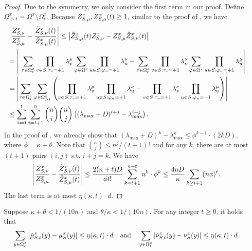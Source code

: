 \begin{proof}
Due to the symmetry, we only consider the first term in our proof.
Define $\Omega^x_{> t}=\Omega^x \setminus\Omega^x_{t}$.
Because $Z_{S,\mu}^x,\tilde{Z}_{S,\mu}^x (t)\geq 1$, similar to the proof of , we have
\begin{align*}
    &\left\vert \frac{Z_{S,\nu}^x}{Z_{S,\mu}^x} - \frac{\tilde{Z}_{S,\nu}^x (t)}{\tilde{Z}_{S,\mu}^x (t)} \right\vert \leq 
    \left\vert \tilde{Z}_{S,\mu}^x (t) Z_{S,\nu}^x - Z_{S,\mu}^x \tilde{Z}_{S,\nu}^x (t) \right\vert\\
    &=\left\vert \ \sum_{\tau \in \Omega^x_{t}} \prod_{v \in S: \tau_v = +1}\lambda^\mu_v \sum_{\varphi \in \Omega^x} \prod_{u \in S: \varphi_u = +1}\lambda^\nu_u - \sum_{\tau \in \Omega^x_{ t}} \prod_{v \in S: \tau_v = +1}\lambda^\nu_v \sum_{\varphi \in \Omega^x} \prod_{u \in S: \varphi_u = +1}\lambda^\mu_u\right\vert\\
    &=\left\vert \sum_{\tau \in \Omega^x_{ t}}\sum_{\varphi \in \Omega^x_{> t}}\left(\prod_{v \in S: \tau_v = +1}\lambda^\mu_v \prod_{u \in S: \varphi_u = +1}\lambda^\nu_u-\prod_{v \in S: \tau_v = +1}\lambda^\nu_v\prod_{u \in S: \varphi_u = +1}\lambda^\mu_u \right ) \right\vert\\
    &\leq  \sum_{i=0}^{t}\sum_{j=t+1}^{n}\binom{n}{i}\binom{n}{j}\left((\lambda_{\max}+D)^{i+j}-\lambda_{\max}^{i+j} \right).
\end{align*}
In the proof of , we already show that  $(\lambda_{\max}+D)^k - \lambda_{\max}^k \leq \phi^{k-1}\cdot (2kD)$, where $\phi = \kappa + \theta$. Note that $\binom{n}{j}\leq n^j/(t+1)!$ and for any $k$, there are at most $(t+1)$ pairs $(i,j)$ s.t. $i+j=k$. We have
\begin{align*}
 \left\vert \frac{Z_{S,\nu}^x}{Z_{S,\mu}^x} - \frac{\tilde{Z}_{S,\nu}^x (t)}{\tilde{Z}_{S,\mu}^x (t)} \right\vert  \leq \frac{2(n+t)D}{\phi t!}   \sum_{k=t+1}^{n+t}{n^k}\cdot \phi^{k} \leq \frac{4nD}{\kappa} \sum_{k \geq t+1}(n\phi)^t.  
\end{align*}
The last term is at most $\eta(\kappa,t) \cdot d$.
\end{proof}

\begin{lemma}\label{lem:sum-bound}
Suppose $\kappa + \theta < 1/(10n)$ and $\theta/\kappa < 1 / (10n)$. For any integer $t \geq 0$,    it holds that 
\begin{align*}
\sum_{y \in \Omega^x_t} \vert \tilde{\mu}_{S,t}^x(y) - \mu^x_S(y) \vert \leq \eta(\kappa,t) \cdot d \quad \text{and} \quad \sum_{y \in \Omega^x_t} \vert \tilde{\nu}_{S,t}^x(y) - \nu^x_S(y) \vert \leq \eta(\kappa,t) \cdot d.
\end{align*}
\end{lemma}

